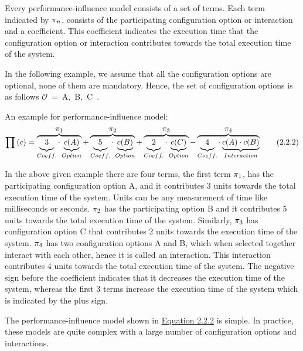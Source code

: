 Every performance-influence model consists of a set of terms. Each term indicated by $\mathlarger{\pi_n}$, consists of the participating configuration option or interaction and a coefficient. This coefficient indicates the execution time that the configuration option or interaction contributes towards the total execution time of the system.

\sloppy In the following example, we assume that all the configuration options are optional, none of them are mandatory. Hence, the set of configuration options is as follows \mbox{$\mathcal{O}$ = \textbraceleft A, B, C \textbraceright}. 


An example for performance-influence model:
\begin{equation*}
 \prod {(c)} = 
 \overbrace {
 \underbrace{\vphantom{c(A)}3}_{Coeff.} \cdot
 \underbrace{ c(A)}_{Option}
 }^{\mathlarger{\pi_1}}
 +
  \overbrace {
 \underbrace{\vphantom{c(B)}5}_{Coeff.} \cdot
 \underbrace{ c(B)}_{Option}
 }^{\mathlarger{\pi_2}}
 +
  \overbrace {
 \underbrace{\vphantom{c(C)}2}_{Coeff.} \cdot
 \underbrace{ c(C)}_{Option}
 }^{\mathlarger{\pi_3}}
 -
  \overbrace {
 \underbrace{\vphantom{c(A) \cdot c(B)}4}_{Coeff.} \cdot
 \underbrace{ c(A) \cdot c(B) }_{Interaction}
 }^{\mathlarger{\pi_4}}
 \tag{2.2.2}\label{eq:2.2.2}
\end{equation*}

In the above given example there are four terms, the first term $\mathlarger{\pi_1}$, has the participating configuration option A, and it contributes 3 units towards the total execution time of the system. Units can be any measurement of time like milliseconds or seconds. $\mathlarger{\pi_2}$ has the participating option B and it contributes 5 units towards the total execution time of the system. Similarly, $\mathlarger{\pi_3}$ has configuration option C that contributes 2 units towards the execution time of the system. $\mathlarger{\pi_4}$ has two configuration options A and B, which when selected together interact with each other, hence it is called an interaction. This interaction contributes 4 units towards the total execution time of the system. The negative sign before the coefficient indicates that it decreases the execution time of the system, whereas the first 3 terms increase the execution time of the system which is indicated by the plus sign.

The performance-influence model shown in \hyperref[eq:2.2.2]{Equation 2.2.2} is simple. In practice, these models are quite complex with a large number of configuration options and interactions. 

